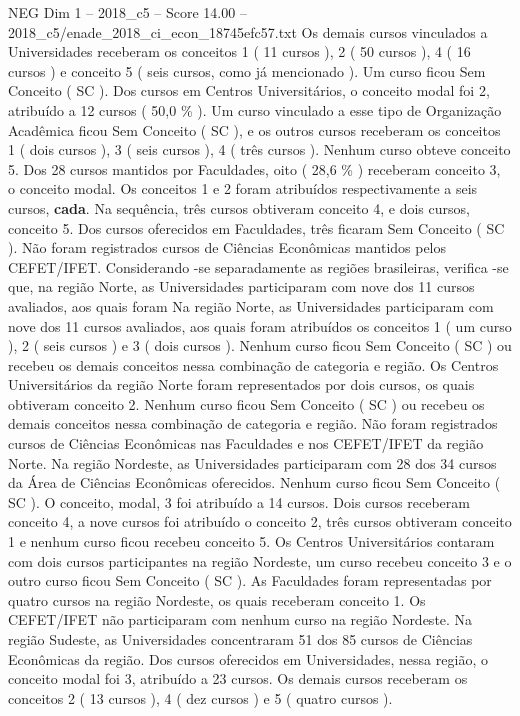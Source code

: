 \begin{textsample}{NEG Dim 1 – 2018\_c5 – Score 14.00 – 2018\_c5/enade\_2018\_ci\_econ\_18745efc57.txt}
Os demais cursos vinculados a Universidades receberam os conceitos 1 ( 11 cursos ), 2 ( 50 cursos ), 4 ( 16 cursos ) e conceito 5 ( seis cursos, como já mencionado ).
Um curso ficou Sem Conceito ( SC ).
Dos cursos em Centros Universitários, o conceito modal foi 2, atribuído a 12 cursos ( 50,0 \% ).
Um curso vinculado a esse tipo de Organização Acadêmica ficou Sem Conceito ( SC ), e os outros cursos receberam os conceitos 1 ( dois cursos ), 3 ( seis cursos ), 4 ( três cursos ).
Nenhum curso obteve conceito 5.
Dos 28 cursos mantidos por Faculdades, oito ( 28,6 \% ) receberam conceito 3, o conceito modal.
Os conceitos 1 e 2 foram atribuídos respectivamente a seis cursos, \textbf{cada}.
Na sequência, três cursos obtiveram conceito 4, e dois cursos, conceito 5.
Dos cursos oferecidos em Faculdades, três ficaram Sem Conceito ( SC ).
Não foram registrados cursos de Ciências Econômicas mantidos pelos CEFET/IFET.
Considerando -se separadamente as regiões brasileiras, verifica -se que, na região Norte, as Universidades participaram com nove dos 11 cursos avaliados, aos quais foram Na região Norte, as Universidades participaram com nove dos 11 cursos avaliados, aos quais foram atribuídos os conceitos 1 ( um curso ), 2 ( seis cursos ) e 3 ( dois cursos ).
Nenhum curso ficou Sem Conceito ( SC ) ou recebeu os demais conceitos nessa combinação de categoria e região.
Os Centros Universitários da região Norte foram representados por dois cursos, os quais obtiveram conceito 2.
Nenhum curso ficou Sem Conceito ( SC ) ou recebeu os demais conceitos nessa combinação de categoria e região.
Não foram registrados cursos de Ciências Econômicas nas Faculdades e nos CEFET/IFET da região Norte.
Na região Nordeste, as Universidades participaram com 28 dos 34 cursos da Área de Ciências Econômicas oferecidos.
Nenhum curso ficou Sem Conceito ( SC ).
O conceito, modal, 3 foi atribuído a 14 cursos.
Dois cursos receberam conceito 4, a nove cursos foi atribuído o conceito 2, três cursos obtiveram conceito 1 e nenhum curso ficou recebeu conceito 5.
Os Centros Universitários contaram com dois cursos participantes na região Nordeste, um curso recebeu conceito 3 e o outro curso ficou Sem Conceito ( SC ).
As Faculdades foram representadas por quatro cursos na região Nordeste, os quais receberam conceito 1.
Os CEFET/IFET não participaram com nenhum curso na região Nordeste.
Na região Sudeste, as Universidades concentraram 51 dos 85 cursos de Ciências Econômicas da região.
Dos cursos oferecidos em Universidades, nessa região, o conceito modal foi 3, atribuído a 23 cursos.
Os demais cursos receberam os conceitos 2 ( 13 cursos ), 4 ( dez cursos ) e 5 ( quatro cursos ).

\end{textsample}
